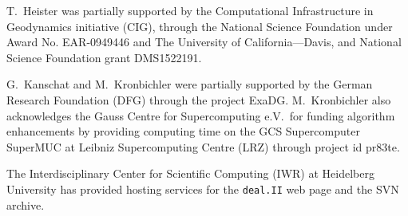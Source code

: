 \documentclass{ansarticle-preprint}
\newcommand{\specialword}[1]{\texttt{#1}}
\newcommand{\dealii}{{\specialword{deal.II}}}
\begin{document}
T.~Heister was partially supported by the Computational Infrastructure in
Geodynamics initiative (CIG), through the National Science Foundation under Award No. EAR-0949446 and The University of California—Davis, and National Science Foundation grant DMS1522191.

G.~Kanschat and M.~Kronbichler were partially supported by the German Research
Foundation (DFG) through the project ExaDG. M.~Kronbichler also acknowledges
the Gauss Centre for Supercomputing e.V.~for funding algorithm enhancements by
providing computing time on the GCS Supercomputer SuperMUC at Leibniz
Supercomputing Centre (LRZ) through project id pr83te.

The Interdisciplinary Center for Scientific Computing (IWR) at Heidelberg University has provided
hosting services for the \dealii{} web page and the SVN archive.



{}

\end{document}
